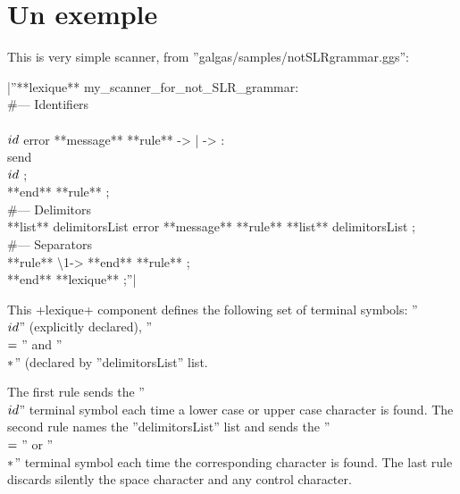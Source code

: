 \section{Un exemple}

This is very simple scanner, from ''galgas/samples/notSLRgrammar.ggs'':

|''**lexique** my\_scanner\_for\_not\_SLR\_grammar:\\
\#--- Identifiers\\
\\$id\\$ error **message** %
**rule** \textquotesingle -> \textquotesingle | \textquotesingle -> \textquotesingle :\\
 send \\$id\\$ ;\\ **end** **rule** ;\\
\#--- Delimitors\\
**list** delimitorsList error **message** %
**rule** **list** delimitorsList ;\\
\#--- Separators\\
**rule** \textquotesingle\textbackslash{1}\textquotesingle -> %
**end** **rule** ;\\
**end** **lexique** ;''|

This \ggsq+lexique+ component defines the following set of terminal symbols: ''\\$id\\$'' (explicitly declared), ''\\$=\\$'' and ''\\$*\\$'' (declared  by ''delimitorsList'' list.

The first rule sends the ''\\$id\\$'' terminal symbol each time a lower case or upper case character is found. The second rule names the ''delimitorsList'' list and sends the ''\\$=\\$'' or ''\\$*\\$'' terminal symbol each time the corresponding character is found. The last rule discards silently the space character and any control character.

